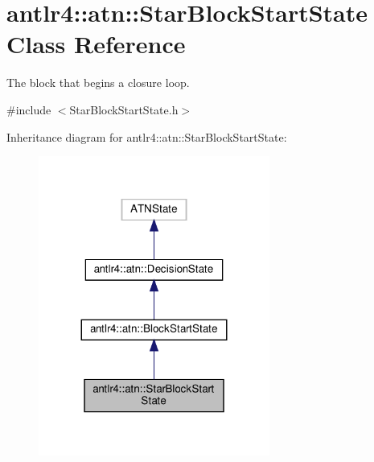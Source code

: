 \hypertarget{classantlr4_1_1atn_1_1StarBlockStartState}{}\section{antlr4\+:\+:atn\+:\+:Star\+Block\+Start\+State Class Reference}
\label{classantlr4_1_1atn_1_1StarBlockStartState}


The block that begins a closure loop.  




{\ttfamily \#include $<$Star\+Block\+Start\+State.\+h$>$}



Inheritance diagram for antlr4\+:\+:atn\+:\+:Star\+Block\+Start\+State\+:
\nopagebreak
\begin{figure}[H]
\begin{center}
\leavevmode
\includegraphics[width=215pt]{classantlr4_1_1atn_1_1StarBlockStartState__inherit__graph}
\end{center}
\end{figure}


